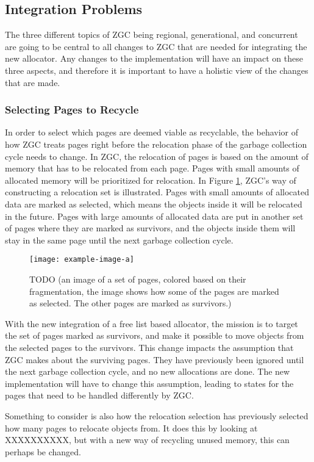 \subsection{Integration Problems}
The three different topics of ZGC being regional, generational, and concurrent are going to be central to all changes to ZGC that are needed for integrating the new allocator. Any changes to the implementation will have an impact on these three aspects, and therefore it is important to have a holistic view of the changes that are made.
\subsubsection{Selecting Pages to Recycle}
In order to select which pages are deemed viable as recyclable, the behavior of how ZGC treats pages right before the relocation phase of the garbage collection cycle needs to change. In ZGC, the relocation of pages is based on the amount of memory that has to be relocated from each page. Pages with small amounts of allocated memory will be prioritized for relocation. In Figure \ref{fig:rel_set_selector}, ZGC's way of constructing a relocation set is illustrated. Pages with small amounts of allocated data are marked as selected, which means the objects inside it will be relocated in the future. Pages with large amounts of allocated data are put in another set of pages where they are marked as survivors, and the objects inside them will stay in the same page until the next garbage collection cycle. 

\begin{figure}[H]
    \centering
    \texttt{[image: example-image-a]}
    \caption{TODO (an image of a set of pages, colored based on their fragmentation, the image shows how some of the pages are marked as selected. The other pages are marked as survivors.)}
    \label{fig:rel_set_selector}
\end{figure} 

With the new integration of a free list based allocator, the mission is to target the set of pages marked as survivors, and make it possible to move objects from the selected pages to the survivors. This change impacts the assumption that ZGC makes about the surviving pages. They have previously been ignored until the next garbage collection cycle, and no new allocations are done. The new implementation will have to change this assumption, leading to states for the pages that need to be handled differently by ZGC.

Something to consider is also how the relocation selection has previously selected how many pages to relocate objects from. It does this by looking at XXXXXXXXXX, but with a new way of recycling unused memory, this can perhaps be changed.

